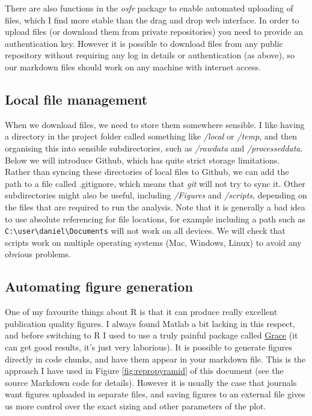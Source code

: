 \documentclass[
]{article}
\begin{document}
There are also functions in the \emph{osfr} package to enable automated uploading of files, which I find more stable than the drag and drop web interface. In order to upload files (or download them from private repositories) you need to provide an authentication key. However it is possible to download files from any public repository without requiring any log in details or authentication (as above), so our markdown files should work on any machine with internet access.

\hypertarget{local-file-management}{%
\subsection{Local file management}\label{local-file-management}}

When we download files, we need to store them somewhere sensible. I like having a directory in the project folder called something like \emph{/local} or \emph{/temp}, and then organising this into sensible subdirectories, such as \emph{/rawdata} and \emph{/processeddata}. Below we will introduce Github, which has quite strict storage limitations. Rather than syncing these directories of local files to Github, we can add the path to a file called .gitignore, which means that \emph{git} will not try to sync it. Other subdirectories might also be useful, including \emph{/Figures} and \emph{/scripts}, depending on the files that are required to run the analysis. Note that it is generally a bad idea to use absolute referencing for file locations, for example including a path such as \texttt{C:\textbackslash{}user\textbackslash{}daniel\textbackslash{}Documents} will not work on all devices. We will check that scripts work on multiple operating systems (Mac, Windows, Linux) to avoid any obvious problems.

\hypertarget{automating-figure-generation}{%
\subsection{Automating figure generation}\label{automating-figure-generation}}

One of my favourite things about R is that it can produce really excellent publication quality figures. I always found Matlab a bit lacking in this respect, and before switching to R I used to use a truly painful package called \href{https://plasma-gate.weizmann.ac.il/Grace/}{Grace} (it can get good results, it's just very laborious). It is possible to generate figures directly in code chunks, and have them appear in your markdown file. This is the approach I have used in Figure \ref{fig:repropyramid} of this document (see the source Markdown code for details). However it is usually the case that journals want figures uploaded in separate files, and saving figures to an external file gives us more control over the exact sizing and other parameters of the plot.
\end{document}
